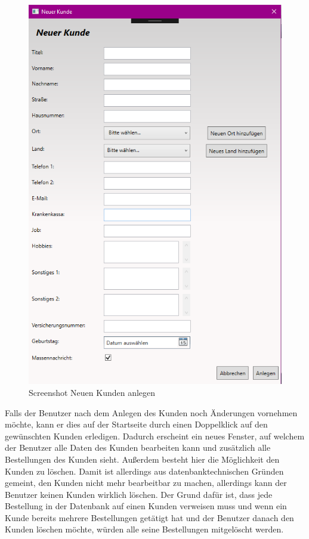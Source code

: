 \begin{figure}[H]
\begin{center}
	\includegraphics[scale=.25]{images/NeuerKunde.png}
\end{center}
	\caption{Screenshot Neuen Kunden anlegen}
	\label{fig:sample}
\end{figure}
Falls der Benutzer nach dem Anlegen des Kunden noch Änderungen vornehmen möchte, kann er dies auf der Startseite durch einen Doppelklick auf den gewünschten Kunden erledigen. Dadurch erscheint ein neues Fenster, auf welchem der Benutzer alle Daten des Kunden bearbeiten kann und zusätzlich alle Bestellungen des Kunden sieht. Außerdem besteht hier die Möglichkeit den Kunden zu löschen. Damit ist allerdings aus datenbanktechnischen Gründen gemeint, den Kunden nicht mehr bearbeitbar zu machen, allerdings kann der Benutzer keinen Kunden wirklich löschen. Der Grund dafür ist, dass jede Bestellung in der Datenbank auf einen Kunden verweisen muss und wenn ein Kunde bereits mehrere Bestellungen getätigt hat und der Benutzer danach den Kunden löschen möchte, würden alle seine Bestellungen mitgelöscht werden. 
